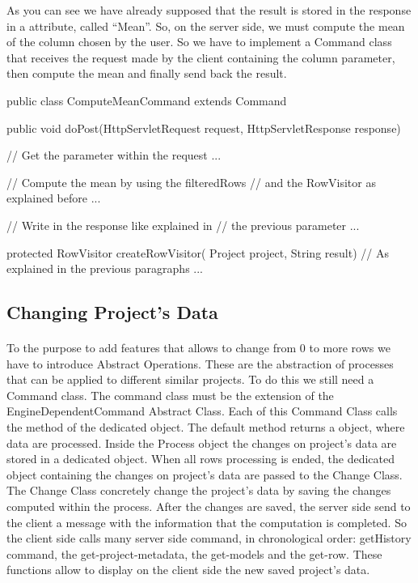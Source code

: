As you can see we have already supposed that the result is stored in the response in a attribute, called ``Mean''. So, on the server side, we must compute the mean of the column chosen by the user. So we have to implement a Command class that receives the request made by the client containing the column parameter, then compute the mean and finally send back the result.
\begin{code}
public class ComputeMeanCommand extends Command {
   
   public void doPost(HttpServletRequest request, 
                      HttpServletResponse response) {
      // Get the parameter within the request
      ...
      
      // Compute the mean by using the filteredRows
      // and the RowVisitor as explained before
      ...
      
      // Write in the response like explained in
      // the previous parameter
      ...
      }

   protected RowVisitor createRowVisitor(
                Project project, String result) {
      // As explained in the previous paragraphs
      ...
   }
}  
\end{code}

\subsection{Changing Project's Data}
\paragraph{}To the purpose to add features that allows to change from 0 to more rows we have to introduce Abstract Operations. These are the abstraction of processes that can be applied to different similar projects. To do this we still need a Command class. The command class must be the extension of the EngineDependentCommand Abstract Class. Each of this Command Class calls the  method of the dedicated  object. The default  method returns a  object, where data are processed. Inside the Process object the changes on project's data are stored in a dedicated object. When all rows processing is ended, the dedicated object containing the changes on project's data are passed to the Change Class. The Change Class concretely change the project's data by saving the changes computed within the process. After the changes are saved, the server side send to the client a message with the information that the computation is completed. So the client side calls many server side command, in chronological order: getHistory command, the get-project-metadata, the get-models and the get-row. These functions allow to display on the client side the new saved project's data.

